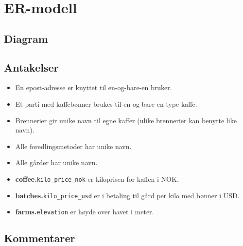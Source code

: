 \section{ER-modell}

\subsection{Diagram}

\vspace{1cm}



\pagebreak

\subsection{Antakelser}

\begin{itemize}
    \item En epost-adresse er knyttet til en-og-bare-en bruker.
    \item Et parti med kaffebønner brukes til en-og-bare-en type kaffe.
    \item Brennerier gir unike navn til egne kaffer (ulike brennerier kan benytte like navn).
    \item Alle foredlingsmetoder har unike navn.
    \item Alle gårder har unike navn.
    \item \textbf{coffee.}\verb|kilo_price_nok| er kiloprisen for kaffen i NOK.
    \item \textbf{batches.}\verb|kilo_price_usd| er i betaling til gård per kilo med bønner i USD.
    \item \textbf{farms.}\verb|elevation| er høyde over havet i meter.
\end{itemize}

\subsection{Kommentarer}

